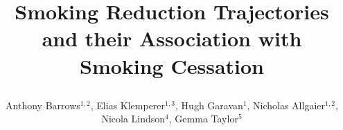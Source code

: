 \title{
	\parbox{\titlewidth}{
		\centering
			Smoking Reduction Trajectories and their Association with Smoking Cessation
			\vspace{.5em}
		}
	}


\author{\large Anthony Barrows$^{1,2}$, Elias Klemperer$^{1,3}$, Hugh Garavan$^{1}$, Nicholas Allgaier$^{1,2}$, Nicola Lindson$^4$, Gemma Taylor$^5$}



\makeatletter
\def\title#1{\gdef\@title{\scalebox{\TP@titletextscale}{%
			\begin{minipage}[t]{\linewidth}
				\centering
				#1
				\par
			\end{minipage}
}}}
\makeatother


\makeatletter
\newcommand\insertlogoi[2][]{\def\@insertlogoi{\texttt{[image: \#2]}}}
\newcommand\insertlogoii[2][]{\def\@insertlogoii{\texttt{[image: \#2]}}}
\newlength\LogoSep
\setlength\LogoSep{0pt}
%
%

